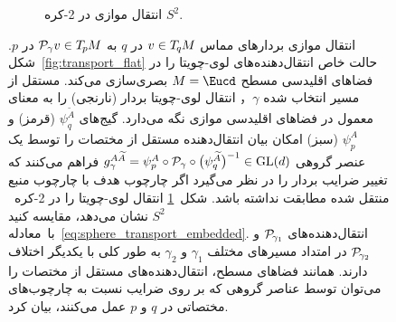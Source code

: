 \begin{figure}
\begin{subfigure}[b]{0.4\textwidth}
        \vspace*{-2ex}
        \caption{\small
            انتقال موازی در 2-کره $S^2$.
        }
        \label{fig:transport_sphere}
    \end{subfigure}
    \caption{\small
        انتقال موازی بردارهای مماس $v\in T_{\mkern-1.5mu q}\mkern-.5muM$ در $q$ به $\mathcal{P}_\gamma v \in T_{\mkern-1.5mu p}\mkern-.5muM$ در $p$.
        شکل~\ref{fig:transport_flat} حالت خاص انتقال‌دهنده‌های لوی-چویتا را در فضاهای اقلیدسی مسطح $M = \Eucd$ بصری‌سازی می‌کند.
        مستقل از مسیر انتخاب شده $\gamma$， انتقال لوی-چویتا بردار (نارنجی) را به معنای معمول در فضاهای اقلیدسی موازی نگه می‌دارد.
        گیج‌های $\psi_q^{\widetilde{A}}$ (قرمز) و $\psi_p^A$ (سبز) امکان بیان انتقال‌دهنده مستقل از مختصات را توسط یک عنصر گروهی
        $g_\gamma^{A\widetilde{A}} = \psi_p^A \circ \mathcal{P}_\gamma \circ \big(\psi_q^{\widetilde{A}}\big)^{-1} \in \operatorname{GL}(d)$
        فراهم می‌کنند که تغییر ضرایب بردار را در نظر می‌گیرد اگر چارچوب هدف با چارچوب منبع منتقل شده مطابقت نداشته باشد.
        شکل~\ref{fig:transport_sphere} انتقال لوی-چویتا را در 2-کره~$S^2$ نشان می‌دهد، مقایسه کنید با~معادله~\eqref{eq:sphere_transport_embedded}.
        انتقال‌دهنده‌های $\mathcal{P}_{\mkern-2mu\gamma_1}$ و $\mathcal{P}_{\mkern-2mu\gamma_2}$ در امتداد مسیرهای مختلف $\gamma_1$ و $\gamma_2$ به طور کلی با یکدیگر اختلاف دارند.
        همانند فضاهای مسطح، انتقال‌دهنده‌های مستقل از مختصات را می‌توان توسط عناصر گروهی که بر روی ضرایب نسبت به چارچوب‌های مختصاتی در $q$ و $p$ عمل می‌کنند، بیان کرد.
    }
    \label{fig:transport}
\end{figure}


